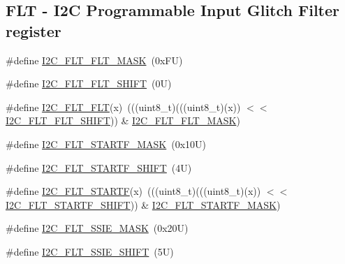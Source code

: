 \subsection*{F\+LT -\/ I2C Programmable Input Glitch Filter register}
\begin{DoxyCompactItemize}
\item 
\#define \mbox{\hyperlink{group___i2_c___register___masks_ga61b9691f2f522b624d0ace6268c972df}{I2\+C\+\_\+\+F\+L\+T\+\_\+\+F\+L\+T\+\_\+\+M\+A\+SK}}~(0x\+F\+U)
\item 
\#define \mbox{\hyperlink{group___i2_c___register___masks_ga87c3021777b04e02f3c0481cdbde30e5}{I2\+C\+\_\+\+F\+L\+T\+\_\+\+F\+L\+T\+\_\+\+S\+H\+I\+FT}}~(0\+U)
\item 
\#define \mbox{\hyperlink{group___i2_c___register___masks_ga7a184e93601a1086484b0ac2752cab00}{I2\+C\+\_\+\+F\+L\+T\+\_\+\+F\+LT}}(x)~(((uint8\+\_\+t)(((uint8\+\_\+t)(x)) $<$$<$ \mbox{\hyperlink{group___i2_c___register___masks_ga87c3021777b04e02f3c0481cdbde30e5}{I2\+C\+\_\+\+F\+L\+T\+\_\+\+F\+L\+T\+\_\+\+S\+H\+I\+FT}})) \& \mbox{\hyperlink{group___i2_c___register___masks_ga61b9691f2f522b624d0ace6268c972df}{I2\+C\+\_\+\+F\+L\+T\+\_\+\+F\+L\+T\+\_\+\+M\+A\+SK}})
\item 
\#define \mbox{\hyperlink{group___i2_c___register___masks_ga5957e41d1f413c45abde107e68d1f054}{I2\+C\+\_\+\+F\+L\+T\+\_\+\+S\+T\+A\+R\+T\+F\+\_\+\+M\+A\+SK}}~(0x10\+U)
\item 
\#define \mbox{\hyperlink{group___i2_c___register___masks_ga60596c41d1748a538e7e752c9b701bb3}{I2\+C\+\_\+\+F\+L\+T\+\_\+\+S\+T\+A\+R\+T\+F\+\_\+\+S\+H\+I\+FT}}~(4\+U)
\item 
\#define \mbox{\hyperlink{group___i2_c___register___masks_gaa827d7e187b279eb296a11df6a520da9}{I2\+C\+\_\+\+F\+L\+T\+\_\+\+S\+T\+A\+R\+TF}}(x)~(((uint8\+\_\+t)(((uint8\+\_\+t)(x)) $<$$<$ \mbox{\hyperlink{group___i2_c___register___masks_ga60596c41d1748a538e7e752c9b701bb3}{I2\+C\+\_\+\+F\+L\+T\+\_\+\+S\+T\+A\+R\+T\+F\+\_\+\+S\+H\+I\+FT}})) \& \mbox{\hyperlink{group___i2_c___register___masks_ga5957e41d1f413c45abde107e68d1f054}{I2\+C\+\_\+\+F\+L\+T\+\_\+\+S\+T\+A\+R\+T\+F\+\_\+\+M\+A\+SK}})
\item 
\#define \mbox{\hyperlink{group___i2_c___register___masks_ga532d6e283f53b115820f6a20f4f442a8}{I2\+C\+\_\+\+F\+L\+T\+\_\+\+S\+S\+I\+E\+\_\+\+M\+A\+SK}}~(0x20\+U)
\item 
\#define \mbox{\hyperlink{group___i2_c___register___masks_ga6fa677ac36d808e9e048d3ab81623f8c}{I2\+C\+\_\+\+F\+L\+T\+\_\+\+S\+S\+I\+E\+\_\+\+S\+H\+I\+FT}}~(5\+U)

\end{DoxyCompactItemize}
